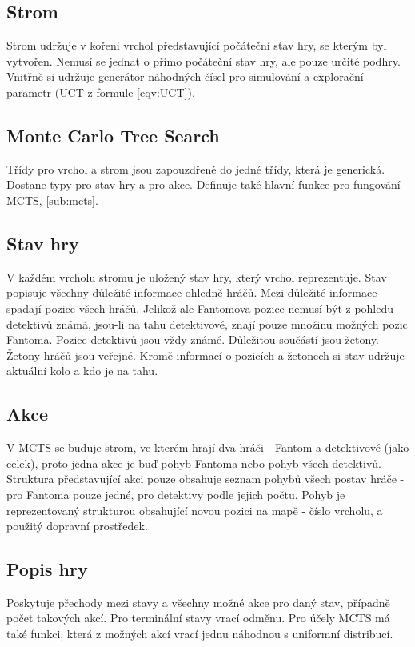 \subsection{Strom}
Strom udržuje v kořeni vrchol představující počáteční stav hry, se kterým byl vytvořen. Nemusí se jednat o přímo počáteční stav hry, ale pouze určité podhry. Vnitřně si udržuje generátor náhodných čísel pro simulování a explorační parametr (UCT z formule \ref{eqv:UCT}).

\subsection{Monte Carlo Tree Search}
Třídy pro vrchol a strom jsou zapouzdřené do jedné třídy, která je generická. Dostane typy pro stav hry a pro akce. Definuje také hlavní funkce pro fungování MCTS, \cref{sub:mcts}.


\subsection{Stav hry}
V každém vrcholu stromu je uložený stav hry, který vrchol reprezentuje. Stav popisuje všechny důležité informace ohledně hráčů. Mezi důležité informace spadají pozice všech hráčů. Jelikož ale Fantomova pozice nemusí být z pohledu detektivů známá, jsou-li na tahu detektivové, znají pouze množinu možných pozic Fantoma. Pozice detektivů jsou vždy známé. Důležitou součástí jsou žetony. Žetony hráčů jsou veřejné. Kromě informací o pozicích a žetonech si stav udržuje aktuální kolo a kdo je na tahu.    

\subsection{Akce}
V MCTS se buduje strom, ve kterém hrají dva hráči - Fantom a detektivové (jako celek), proto jedna akce je buď pohyb Fantoma nebo pohyb všech detektivů. Struktura představující akci pouze obsahuje seznam pohybů všech postav hráče - pro Fantoma pouze jedné, pro detektivy podle jejich počtu. Pohyb je reprezentovaný strukturou obsahující novou pozici na mapě - číslo vrcholu, a použitý dopravní prostředek. 

\subsection{Popis hry}
Poskytuje přechody mezi stavy a všechny možné akce pro daný stav, případně počet takových akcí. Pro terminální stavy vrací odměnu. Pro účely MCTS má také funkci, která z možných akcí vrací jednu náhodnou s uniformní distribucí.


